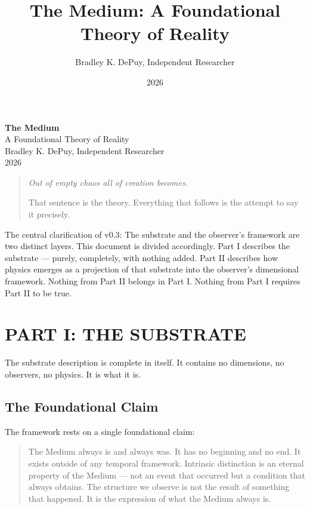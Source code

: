 \documentclass[11pt,letterpaper]{article}
\author{Bradley K. DePuy, Independent Researcher}
\date{2026}
\title{The Medium: A Foundational Theory of Reality}
\begin{document}
\pagestyle{plain}
\begin{titlepage}
\vspace*{4cm}
\begin{center}
  {\LARGE\bfseries The Medium}\\[0.6em]
  {\large A Foundational Theory of Reality}\\[2.5em]
  {\normalsize Bradley K. DePuy, Independent Researcher}\\[0.5em]
  {\normalsize 2026}
\end{center}
\end{titlepage}

\pagestyle{plain}
\tableofcontents
\clearpage

\pagestyle{body}

\begin{quote}
\emph{Out of empty chaos all of creation becomes.}

That sentence is the theory. Everything that follows is the attempt to say it precisely.
\end{quote}

The central clarification of v0.3: The substrate and the observer's framework are two distinct layers. This document is divided accordingly. Part I describes the substrate --- purely, completely, with nothing added. Part II describes how physics emerges as a projection of that substrate into the observer's dimensional framework. Nothing from Part II belongs in Part I. Nothing from Part I requires Part II to be true.
\section{PART I: THE SUBSTRATE}
\label{sec:org32d89f7}

The substrate description is complete in itself. It contains no dimensions, no observers, no physics. It is what it is.
\subsection{The Foundational Claim}
\label{sec:orgb29369a}

The framework rests on a single foundational claim:

\begin{quote}
The Medium always is and always was. It has no beginning and no end. It exists outside of any temporal framework. Intrinsic distinction is an eternal property of the Medium --- not an event that occurred but a condition that always obtains. The structure we observe is not the result of something that happened. It is the expression of what the Medium always is.
\end{quote}
\end{document}
